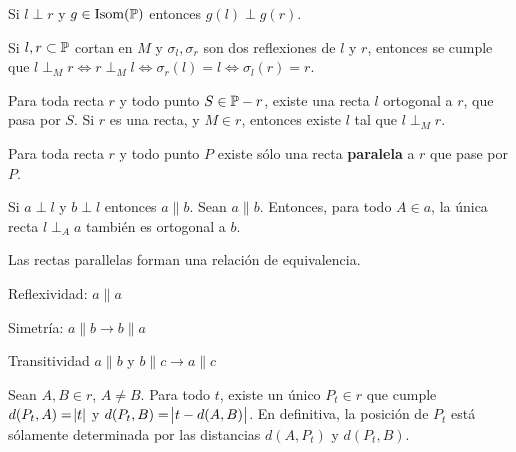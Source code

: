  Si $l \perp r$ y $g \in \iso(\P)$ entonces $g(l) \perp g(r)$.

 Si $l, r \subset \P$ cortan en $M$ y $\sigma_l, \sigma_r$ son dos reflexiones de $l$ y $r$, entonces se cumple que $l \perp_M r \iff r \perp_M l \iff \sigma_r(l) = l \iff \sigma_l(r) = r$.

 Para toda recta $r$ y todo punto $S \in \P - r$, existe una recta $l$ ortogonal a $r$, que pasa por $S$. Si $r$ es una recta, y $M \in r$, entonces existe $l$ tal que $l \perp_M r$.

 Para toda recta $r$ y todo punto $P$ existe sólo una recta \textbf{paralela} a $r$ que pase por $P$.

 Si $a \perp l$ y $b \perp l$ entonces $a \parallel b$. Sean $a \parallel b$. Entonces, para todo $A \in a$, la única recta $l \perp_A a$ también es ortogonal a $b$.

 Las rectas parallelas forman una relación de equivalencia.
\begin{itemizex}
	\item Reflexividad: $a\parallel a$
	\item Simetría: $a \parallel b \rightarrow b \parallel a$
	\item Transitividad  $a \parallel b $ y  $b \parallel c \rightarrow a \parallel c$
\end{itemizex}

 Sean $A,B \in r$, $A \neq B$. Para todo $t$, existe un único $P_t\in r$ que cumple $d(P_t,A) = \abs{t}$ y $d(P_t, B) = \abs{t-d(A,B)}$. En definitiva, la posición de $P_t$ está sólamente determinada por las distancias $d(A, P_t)$ y $d(P_t, B)$.
	 
	 
	 
	 
	 
	 
	 